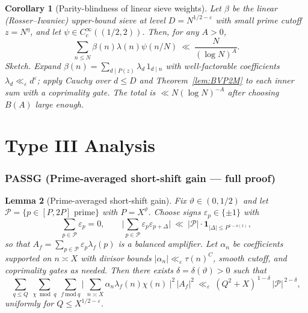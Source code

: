 \documentclass[11pt]{article}
\newtheorem{lemma}{Lemma}[part]
\newtheorem{corollary}[lemma]{Corollary}
\theoremstyle{definition}
\theoremstyle{remark}
\numberwithin{equation}{part}
\begin{document}
\begin{corollary}[Parity-blindness of linear sieve weights]\label{cor:parityblind}
	Let $\beta$ be the linear (Rosser–Iwaniec) upper-bound sieve at level $D=N^{1/2-\varepsilon}$ with small prime cutoff $z=N^{\eta}$, and let $\psi\in C_c^\infty((1/2,2))$. Then, for any $A>0$,
	\[
		\sum_{n\le N}\beta(n)\lambda(n)\psi(n/N)\ \ll\ \frac{N}{(\log N)^A}.
	\]
	\emph{Sketch.} Expand $\beta(n)=\sum_{d\mid P(z)}\lambda_d\,1_{d\mid n}$ with well-factorable coefficients $\lambda_d\ll_\varepsilon d^\varepsilon$; apply Cauchy over $d\le D$ and Theorem~\ref{lem:BVP2M} to each inner sum with a coprimality gate. The total is $\ll N(\log N)^{-A}$ after choosing $B(A)$ large enough.
\end{corollary}


\part{Type III Analysis}

\section{PASSG (Prime-averaged short-shift gain — full proof)}

\begin{lemma}[Prime-averaged short-shift gain]\label{lem:PASSG}
	Fix $\vartheta\in(0,1/2)$ and let $\mathcal P=\{p\in[P,2P]\text{ prime}\}$ with $P=X^\vartheta$.
	Choose signs $\varepsilon_p\in\{\pm1\}$ with
	\[
		\sum_{p\in\mathcal P}\varepsilon_p=0,
		\qquad
		\Big|\sum_{p\in\mathcal P}\varepsilon_p\varepsilon_{p+\Delta}\Big|
		\ \ll\ |\mathcal P|\cdot\mathbf1_{|\Delta|\le P^{1-o(1)}},
	\]
	so that $A_f=\sum_{p\in\mathcal P}\varepsilon_p\lambda_f(p)$ is a balanced amplifier.
	Let $\alpha_n$ be coefficients supported on $n\asymp X$ with divisor bounds $|\alpha_n|\ll_\varepsilon \tau(n)^C$, smooth cutoff, and coprimality gates as needed.
	Then there exists $\delta=\delta(\vartheta)>0$ such that
	\begin{equation}\label{eq:S2.4_goal}
		\sum_{q\le Q}\ \sum_{\chi\bmod q}\ \sum_{f\ \mathrm{mod}\ q}
		\Bigg|\ \sum_{n\asymp X}\alpha_n \lambda_f(n)\chi(n)\ \Bigg|^2\,|A_f|^2
		\ \ll_\varepsilon\ (Q^2+X)^{\,1-\delta}\,|\mathcal P|^{\,2-\delta},
	\end{equation}
	uniformly for $Q\le X^{1/2-\varepsilon}$.
\end{lemma}
\end{document}
